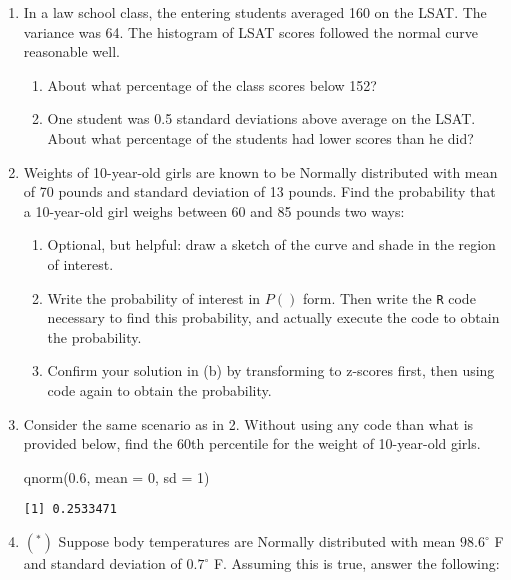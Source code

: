 \documentclass[
  letterpaper,
  DIV=11,
  numbers=noendperiod]{scrartcl}
\newenvironment{Shaded}{\begin{snugshade}}{\end{snugshade}}
\newcommand{\AttributeTok}[1]{\textcolor[rgb]{0.40,0.45,0.13}{#1}}
\newcommand{\DecValTok}[1]{\textcolor[rgb]{0.68,0.00,0.00}{#1}}
\newcommand{\FloatTok}[1]{\textcolor[rgb]{0.68,0.00,0.00}{#1}}
\newcommand{\FunctionTok}[1]{\textcolor[rgb]{0.28,0.35,0.67}{#1}}
\newcommand{\NormalTok}[1]{\textcolor[rgb]{0.00,0.23,0.31}{#1}}
\begin{document}
\begin{enumerate}
\def\labelenumi{\arabic{enumi}.}
\item
  In a law school class, the entering students averaged 160 on the LSAT.
  The variance was 64. The histogram of LSAT scores followed the normal
  curve reasonable well.

  \begin{enumerate}
  \def\labelenumii{\alph{enumii}.}
  \item
    About what percentage of the class scores below 152?
  \item
    One student was 0.5 standard deviations above average on the LSAT.
    About what percentage of the students had lower scores than he did?
  \end{enumerate}
\item
  Weights of 10-year-old girls are known to be Normally distributed with
  mean of 70 pounds and standard deviation of 13 pounds. Find the
  probability that a 10-year-old girl weighs between 60 and 85 pounds
  two ways:

  \begin{enumerate}
  \def\labelenumii{\alph{enumii}.}
  \item
    Optional, but helpful: draw a sketch of the curve and shade in the
    region of interest.
  \item
    Write the probability of interest in \(P()\) form. Then write the
    \texttt{R} code necessary to find this probability, and actually
    execute the code to obtain the probability.
  \item
    Confirm your solution in (b) by transforming to z-scores first, then
    using code again to obtain the probability.
  \end{enumerate}
\item
  Consider the same scenario as in 2. Without using any code than what
  is provided below, find the 60th percentile for the weight of
  10-year-old girls.

\begin{Shaded}
\begin{Highlighting}[]
\FunctionTok{qnorm}\NormalTok{(}\FloatTok{0.6}\NormalTok{, }\AttributeTok{mean =} \DecValTok{0}\NormalTok{, }\AttributeTok{sd =} \DecValTok{1}\NormalTok{)}
\end{Highlighting}
\end{Shaded}

\begin{verbatim}
[1] 0.2533471
\end{verbatim}
\item
  \((^*)\) Suppose body temperatures are Normally distributed with mean
  \(98.6^\circ\) F and standard deviation of \(0.7^\circ\) F. Assuming
  this is true, answer the following:


\end{enumerate}
\end{document}
